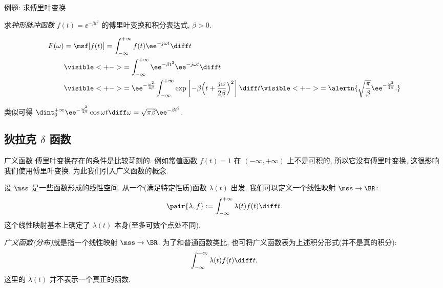 \begin{frame}{例题: 求傅里叶变换}
	\onslide<+->
	\begin{example}
		求\emph{钟形脉冲函数} $f(t)=\ee^{-\beta t^2}$ 的傅里叶变换和积分表达式, $\beta>0$.
	\end{example}

	\onslide<+->
	\begin{solution}
		\bigdel
		\begin{align*}
			F(\omega)&=\msf[f(t)]=\int_{-\infty}^{+\infty}f(t)\ee^{-j\omega t}\diff t\\
			&\visible<+->{=\int_{-\infty}^{+\infty}\ee^{-\beta t^2}\ee^{-j\omega t}\diff t}\\
			&\visible<+->{=\ee^{-\frac{\omega^2}{4\beta}}\int_{-\infty}^{+\infty}\exp\left[-\beta\Bigl(t+\frac{j\omega}{2\beta}\Bigr)^2\right]\diff t}
			\visible<+->{=\alertn{\sqrt{\frac\pi\beta}\ee^{-\frac{\omega^2}{4\beta}}.}}
		\end{align*}
	\end{solution}

	\onslide<+->
	类似可得
	$\dint_0^{+\infty}\ee^{-\frac{\omega^2}{4\beta}}\cos\omega t\diff\omega=\sqrt{\pi\beta}\ee^{-\beta t^2}$.
\end{frame}


\subsection{狄拉克 \texorpdfstring{$\delta$}{δ} 函数}

\begin{frame}{广义函数}
	\onslide<+->
	傅里叶变换存在的条件是比较苛刻的.
	\onslide<+->
	例如常值函数 $f(t)=1$ 在 $(-\infty,+\infty)$ 上不是可积的, 所以它没有傅里叶变换, 这很影响我们使用傅里叶变换.
	\onslide<+->
	为此我们引入广义函数的概念.

	\onslide<+->
	设 $\mss$ 是一些函数形成的线性空间.
	\onslide<+->
	从一个(满足特定性质)函数 $\lambda(t)$ 出发, 我们可以定义一个线性映射 $\mss\to \BR$:
	\[\pair{\lambda,f}:=\int_{-\infty}^{+\infty}\lambda(t)f(t)\diff t.
	\]
	\onslide<+->
	这个线性映射基本上确定了 $\lambda(t)$ 本身(至多可数个点处不同).

	\onslide<+->
	\emph{广义函数(分布)}就是指一个线性映射 $\mss\to \BR$.
	\onslide<+->
	为了和普通函数类比, 也可将广义函数表为上述积分形式(并不是真的积分):
	\[\int_{-\infty}^{+\infty}\lambda(t)f(t)\diff t.
	\]
	这里的 $\lambda(t)$ 并不表示一个真正的函数.
\end{frame}


